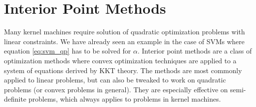 \documentclass{article}
\theoremstyle{plain}
\theoremstyle{definition}
\theoremstyle{remark}
\begin{document}





\section{Interior Point Methods}
Many kernel machines require solution of quadratic optimization problems with linear constraints. 
We have already seen an example in the case of SVMs where equation \eqref{eq:svm_qp} has to be solved for $\alpha$.
Interior point methods are a class of optimization methods where convex optimization techniques are applied to a system of equations derived by KKT theory.
The methods are most commonly applied to linear problems, but can also be tweaked to work on quadratic problems (or convex problems in general).
They are especially effective on semi-definite problems, which always applies to problems in kernel machines.
\end{document}
